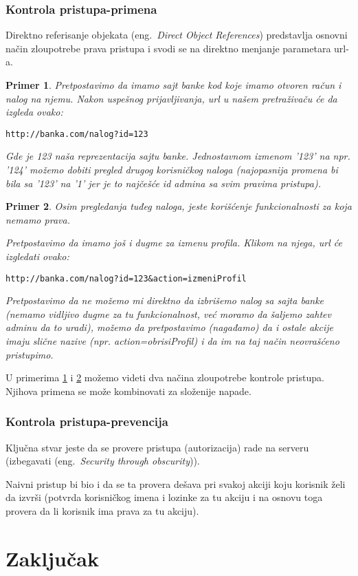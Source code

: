 \documentclass[a4paper]{article}
\newtheorem{primer}{Primer}[section]
\begin{document}
\subsubsection{Kontrola pristupa-primena}
Direktno referisanje objekata (eng.~{\em Direct Object References}) predstavlja osnovni na\v{c}in zloupotrebe prava pristupa i svodi se na direktno menjanje parametara url-a.
\begin{primer}
\label{primer3}
Pretpostavimo da imamo sajt banke kod koje imamo otvoren ra\v{c}un i nalog na njemu. Nakon uspe\v{s}nog prijavljivanja, url u na\v{s}em pretra\v{z}iva\v{c}u \'{c}e da izgleda ovako:
\begin{lstlisting}
http://banka.com/nalog?id=123
\end{lstlisting}
Gde je 123 na\v{s}a reprezentacija sajtu banke. Jednostavnom izmenom '123' na npr. '124' mo\v{z}emo dobiti pregled drugog korisni\v{c}kog naloga (najopasnija promena bi bila sa '123' na '1' jer je to naj\v{c}e\v{s}\'{c}e id admina sa svim pravima pristupa).
\end{primer}
\begin{primer}
\label{primer4}
Osim pregledanja tuđeg naloga, jeste kori\v{s}\'{c}enje funkcionalnosti za koja nemamo prava.

Pretpostavimo da imamo jo\v{s} i dugme za izmenu profila. Klikom na njega, url \'{c}e izgledati ovako:\\

\begin{lstlisting}
http://banka.com/nalog?id=123&action=izmeniProfil
\end{lstlisting}

Pretpostavimo da ne mo\v{z}emo mi direktno da izbri\v{s}emo nalog sa sajta banke (nemamo vidljivo dugme za tu funkcionalnost, ve\'{c} moramo da \v{s}aljemo zahtev adminu da to uradi), mo\v{z}emo da pretpostavimo (nagađamo) da i ostale akcije imaju sli\v{c}ne nazive (npr. action=obrisiProfil) i da im na taj na\v{c}in neovra\v{s}\'{c}eno pristupimo.\\
\end{primer}
U primerima \ref{primer3} i \ref{primer4} možemo videti dva načina zloupotrebe kontrole pristupa. Njihova primena se može kombinovati za složenije napade.
\subsubsection{Kontrola pristupa-prevencija}
Klju\v{c}na stvar jeste da se provere pristupa (autorizacija) rade na serveru        (izbegavati (eng.~{\em Security through obscurity})). 

Naivni pristup bi bio i da se ta provera de\v{s}ava pri svakoj akciji koju korisnik \v{z}eli da izvr\v{s}i (potvrda korisni\v{c}kog imena i lozinke za tu akciju i na osnovu toga provera da li korisnik ima prava za tu akciju).
\section{Zaključak}

\appendix


\end{document}

